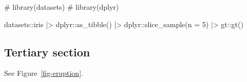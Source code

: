 \documentclass[
12pt,
openright,
oneside,
a4paper,
chapter=TITLE,
section=TITLE,
french,
spanish,
brazil,
english
]{abntex2}\usepackage{array}
\newenvironment{Shaded}{\begin{snugshade}}{\end{snugshade}}
\newcommand{\AttributeTok}[1]{\textcolor[rgb]{0.40,0.45,0.13}{#1}}
\newcommand{\CommentTok}[1]{\textcolor[rgb]{0.37,0.37,0.37}{#1}}
\newcommand{\DecValTok}[1]{\textcolor[rgb]{0.68,0.00,0.00}{#1}}
\newcommand{\FunctionTok}[1]{\textcolor[rgb]{0.28,0.35,0.67}{#1}}
\newcommand{\NormalTok}[1]{\textcolor[rgb]{0.00,0.23,0.31}{#1}}
\newcommand{\SpecialCharTok}[1]{\textcolor[rgb]{0.37,0.37,0.37}{#1}}
\theoremstyle{plain}
\theoremstyle{remark}
\begin{document}

\begin{Shaded}
\begin{Highlighting}[numbers=left,,]
\CommentTok{\# library(datasets)}
\CommentTok{\# library(dplyr)}

\NormalTok{datasets}\SpecialCharTok{::}\NormalTok{iris }\SpecialCharTok{|\textgreater{}}
\NormalTok{  dplyr}\SpecialCharTok{::}\FunctionTok{as\_tibble}\NormalTok{() }\SpecialCharTok{|\textgreater{}}
\NormalTok{  dplyr}\SpecialCharTok{::}\FunctionTok{slice\_sample}\NormalTok{(}\AttributeTok{n =} \DecValTok{5}\NormalTok{) }\SpecialCharTok{|\textgreater{}}
\NormalTok{  gt}\SpecialCharTok{::}\FunctionTok{gt}\NormalTok{()}
\end{Highlighting}
\end{Shaded}

\begin{table}

\caption{\label{tbl-iris}A sample of the famous (Fisher's or Anderson's)
iris data set}


\end{table}%

\subsection{Tertiary section}\label{tertiary-section}

See Figure~\ref{fig-eruption}.

\end{document}
